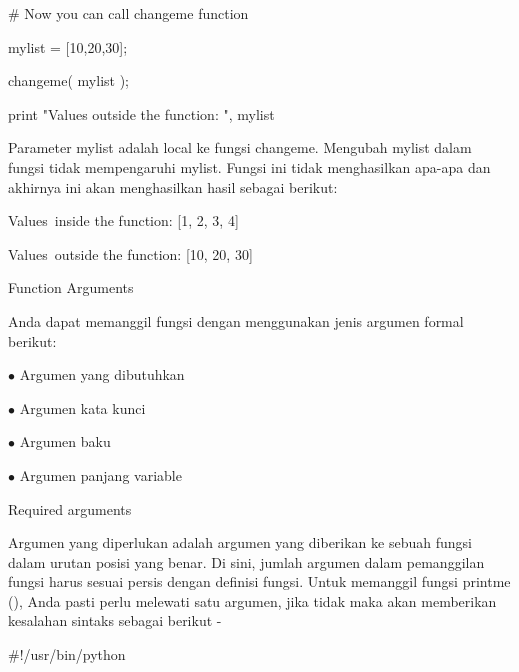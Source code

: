\vspace{12pt}
\noindent 
 \hspace*{0.5in}  $  \#  $ Now you can call changeme function \par
\noindent 
 \hspace*{0.5in} mylist = [10,20,30]; \par
\noindent 
 \hspace*{0.5in} changeme( mylist ); \par
\noindent 
 \hspace*{0.5in} print "Values outside the function: ", mylist \par
\noindent 
Parameter mylist adalah local ke fungsi changeme. Mengubah mylist dalam fungsi tidak mempengaruhi mylist. Fungsi ini tidak menghasilkan apa-apa dan akhirnya ini akan menghasilkan hasil sebagai berikut: \par
\noindent 
 \hspace*{0.5in} Values~inside the function:  [1, 2, 3, 4] \par
\noindent 
 \hspace*{0.5in} Values~outside the function:  [10, 20, 30] \par
\vspace{12pt}
\noindent 
Function Arguments \par
\noindent 
Anda dapat memanggil fungsi dengan menggunakan jenis argumen formal berikut: \par
\noindent 
 \hspace*{0.5in}  $ \bullet $ Argumen yang dibutuhkan \par
\noindent 
 \hspace*{0.5in}  $ \bullet $ Argumen kata kunci \par
\noindent 
 \hspace*{0.5in}  $ \bullet $ Argumen baku \par
\noindent 
 \hspace*{0.5in}  $ \bullet $ Argumen panjang variable \par
\vspace{12pt}
\noindent 
Required arguments \par
\noindent 
Argumen yang diperlukan adalah argumen yang diberikan ke sebuah fungsi dalam urutan posisi yang benar. Di sini, jumlah argumen dalam pemanggilan fungsi harus sesuai persis dengan definisi fungsi. Untuk memanggil fungsi printme (), Anda pasti perlu melewati satu argumen, jika tidak maka akan memberikan kesalahan sintaks sebagai berikut - \par
\noindent 
 \hspace*{0.5in}  $  \#  $!/usr/bin/python \par
